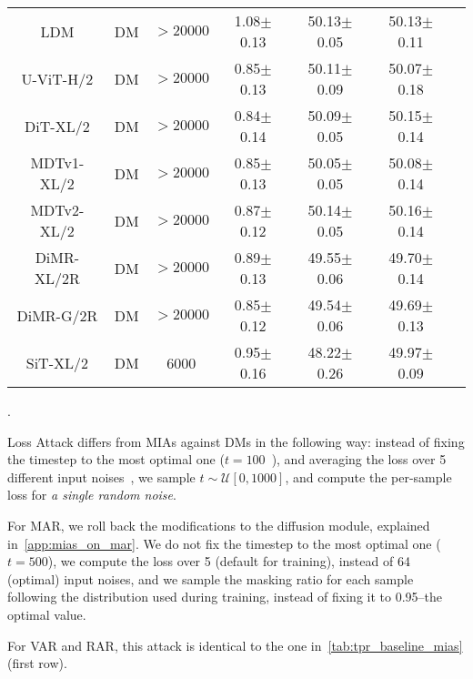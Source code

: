 \begin{table}[]
\begin{tabular}{ccccccc}
\midrule
LDM & DM & $>20000$ & 1.08{\tiny $\pm$0.13} & 50.13{\tiny $\pm$0.05} & 50.13{\tiny $\pm$0.11} \\
U-ViT-H/2 & DM & $>20000$ & 0.85{\tiny $\pm$0.13} & 50.11{\tiny $\pm$0.09} & 50.07{\tiny $\pm$0.18} \\
DiT-XL/2 & DM & $>20000$ & 0.84{\tiny $\pm$0.14} & 50.09{\tiny $\pm$0.05} & 50.15{\tiny $\pm$0.14} \\
MDTv1-XL/2 & DM & $>20000$ & 0.85{\tiny $\pm$0.13} & 50.05{\tiny $\pm$0.05} & 50.08{\tiny $\pm$0.14} \\
MDTv2-XL/2 & DM & $>20000$ & 0.87{\tiny $\pm$0.12} & 50.14{\tiny $\pm$0.05} & 50.16{\tiny $\pm$0.14} \\
DiMR-XL/2R & DM & $>20000$ & 0.89{\tiny $\pm$0.13} & 49.55{\tiny $\pm$0.06} & 49.70{\tiny $\pm$0.14} \\
DiMR-G/2R & DM & $>20000$ & 0.85{\tiny $\pm$0.12} & 49.54{\tiny $\pm$0.06} & 49.69{\tiny $\pm$0.13} \\
SiT-XL/2 & DM & 6000 & 0.95{\tiny $\pm$0.16} & 48.22{\tiny $\pm$0.26} & 49.97{\tiny $\pm$0.09} \\
\bottomrule
\end{tabular}
\label{tab:unified_mia_result}
\end{table}

.

{Loss Attack differs from MIAs against DMs in the following way: instead of fixing the timestep to the most optimal one ($t=100$~\citep{carlini2023extracting}), and averaging the loss over 5 different input noises~\citep{carlini2023extracting}, we sample $t\sim\mathcal{U}[0, 1000]$, and compute the per-sample loss for \textit{a single random noise}}.

{For MAR, we roll back the modifications to the diffusion module, explained in~\cref{app:mias_on_mar}. We do not fix the timestep to the most optimal one ($t=500$), we compute the loss over 5 (default for training), instead of 64 (optimal) input noises, and we sample the masking ratio for each sample following the distribution used during training, instead of fixing it to 0.95--the optimal value.}

{For VAR and RAR, this attack is identical to the one in~\cref{tab:tpr_baseline_mias} (first row).}

